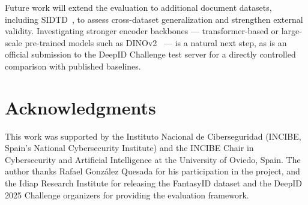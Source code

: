 Future work will extend the evaluation to additional document datasets, including
SIDTD~\cite{TODO_sidtd}, to assess cross-dataset generalization and strengthen
external validity. Investigating stronger encoder backbones --- transformer-based
or large-scale pre-trained models such as DINOv2~\cite{TODO_vit} --- is a natural
next step, as is an official submission to the DeepID Challenge test server for a
directly controlled comparison with published baselines.

\section*{Acknowledgments}
This work was supported by the Instituto Nacional de Ciberseguridad
(INCIBE, Spain's National Cybersecurity Institute) and the INCIBE Chair
in Cybersecurity and Artificial Intelligence at the University of Oviedo, Spain. The author thanks Rafael Gonz\'{a}lez Quesada for his
participation in the project, and the Idiap Research Institute for releasing the
FantasyID dataset and the DeepID 2025 Challenge organizers for providing the
evaluation framework.
